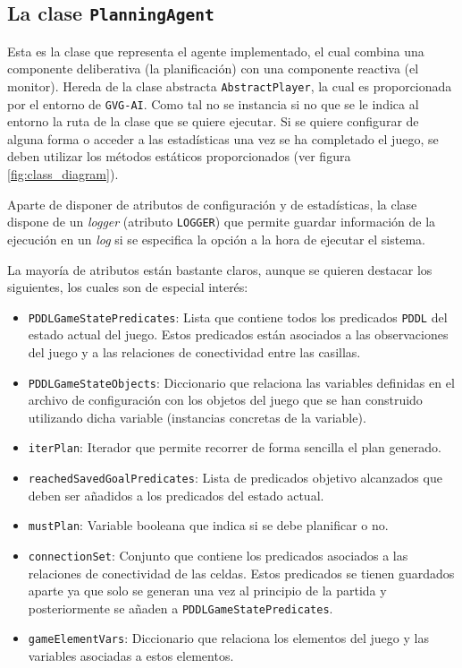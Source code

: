 \subsection{La clase \texttt{PlanningAgent}}

Esta es la clase que representa el agente implementado, el cual combina una componente deliberativa
(la planificación) con una componente reactiva (el monitor). Hereda de la clase abstracta
\texttt{AbstractPlayer}, la cual es proporcionada por el entorno de \texttt{GVG-AI}. Como
tal no se instancia si no que se le indica al entorno la ruta de la clase que se quiere ejecutar.
Si se quiere configurar de alguna forma o acceder a las estadísticas una vez se ha completado
el juego, se deben utilizar los métodos estáticos proporcionados (ver figura \ref{fig:class_diagram}).

Aparte de disponer de atributos de configuración y de estadísticas, la clase dispone de un \textit{logger}
(atributo \texttt{LOGGER}) que permite guardar información de la ejecución en un \textit{log} si
se especifica la opción a la hora de ejecutar el sistema.

La mayoría de atributos están bastante claros, aunque se quieren destacar los siguientes, los cuales
son de especial interés:

\begin{itemize}[label=\textbullet]
    \item \texttt{PDDLGameStatePredicates}: Lista que contiene todos los predicados \texttt{PDDL} del estado
    actual del juego. Estos predicados están asociados a las observaciones del juego y a las relaciones
    de conectividad entre las casillas.
    
    \item \texttt{PDDLGameStateObjects}: Diccionario que relaciona las variables definidas en el archivo
    de configuración con los objetos del juego que se han construido utilizando dicha variable (instancias
    concretas de la variable).
    
    \item \texttt{iterPlan}: Iterador que permite recorrer de forma sencilla el plan generado.
    
    \item \texttt{reachedSavedGoalPredicates}: Lista de predicados objetivo alcanzados que deben
    ser añadidos a los predicados del estado actual.
    
    \item \texttt{mustPlan}: Variable booleana que indica si se debe planificar o no.
    
    \item \texttt{connectionSet}: Conjunto que contiene los predicados asociados a las relaciones
    de conectividad de las celdas. Estos predicados se tienen guardados aparte ya que solo se
    generan una vez al principio de la partida y posteriormente se añaden a \texttt{PDDLGameStatePredicates}.
    
    \item \texttt{gameElementVars}: Diccionario que relaciona los elementos del juego y las
    variables asociadas a estos elementos.
\end{itemize}

